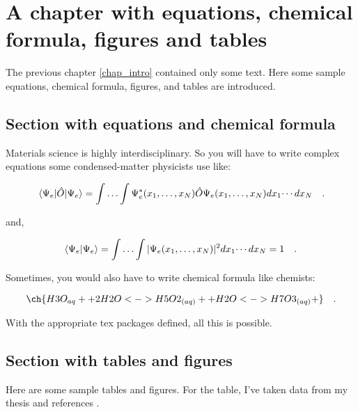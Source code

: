 \chapter{A chapter with equations, chemical formula, figures and tables}
\label{chap_main}

The previous chapter \ref{chap_intro} contained only some text. Here some sample equations, chemical formula, figures, and tables
are introduced.

\section{Section with equations and chemical formula}
\label{sec_eq_fig_tab}

Materials science is highly interdisciplinary. So you will have to write complex equations some condensed-matter physicists use like:

\begin{equation}
\expval{\hat{O}}{\Psi_e} = \int \dotsc \int \Psi_e^{*}(x_1,\dotsc,x_N) \hat{O}
\Psi_e(x_1,\dotsc ,x_N)  dx_1 \dotsi dx_N
\quad .
\label{main_eq1}
\end{equation}

and,

\begin{equation}
\braket{\Psi_e} = \int \dotsc \int |\Psi_e (x_1,\dotsc,x_N)|^2  dx_1\dotsi dx_N = 1
\quad .
\label{main_eq2}
\end{equation}

Sometimes, you would also have to write chemical formula like chemists:

\begin{equation}
\centering
\ch{H3O_{aq}+ + 2 H2O <-> H5O2_{(aq)}+ + H2O <-> H7O3_{(aq)}+} \quad .
\label{main_eq3}
\end{equation}

With the appropriate tex packages defined, all this is possible.

\section{Section with tables and figures}
\label{sec_tab_figs}

Here are some sample tables and figures. For the table, I've taken data from my thesis and references \cite{Singh-miller2009, Sakong2018, Kittel1976, Salmeron1983}.

